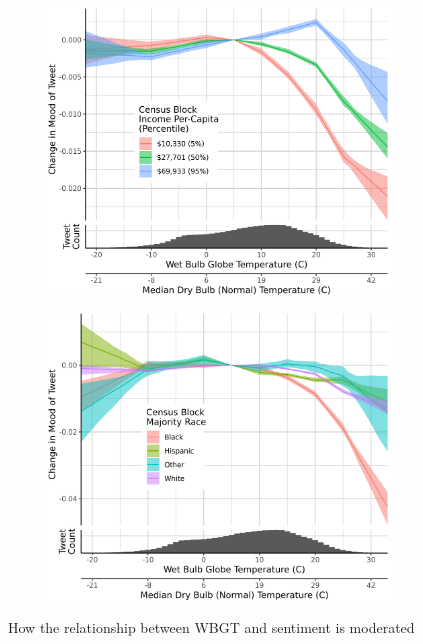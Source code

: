 \documentclass{article}
\begin{document}
\begin{figure}[H]
\centering
\begin{subfigure}{.5\textwidth}
  \centering
  \includegraphics[width=\linewidth]{../res/wbgt-income.png}
  \label{fig:sub1}
\end{subfigure}%
\begin{subfigure}{.5\textwidth}
  \centering
  \includegraphics[width=\linewidth]{../res/wbgt-race_q.png}
  \label{fig:sub2}
\end{subfigure}
\caption{How the relationship between WBGT and sentiment is moderated }
\label{fig:test}
\end{figure}
\end{document}
